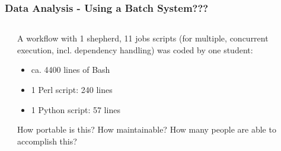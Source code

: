 \begin{frame}
	\frametitle{Data Analysis - Using a Batch System???}
	\begin{columns}
		\begin{column}{0.5\textwidth}
		\end{column}
	    \begin{column}{0.5\textwidth}
	    A workflow with 1 shepherd, 11 jobs scripts (for multiple, concurrent execution, incl. dependency handling) was coded by one student:
	    \begin{itemize}[<+->]
	    	\item ca. 4400 lines of Bash
	    	\item 1 Perl script: 240 lines
	    	\item 1 Python script: 57 lines
	    \end{itemize}
        \pause
	    \begin{question}
	    	How portable is this? How maintainable? How many people are able to accomplish this?
	    \end{question}	
	    \end{column}	
	\end{columns}
	
\end{frame}	

